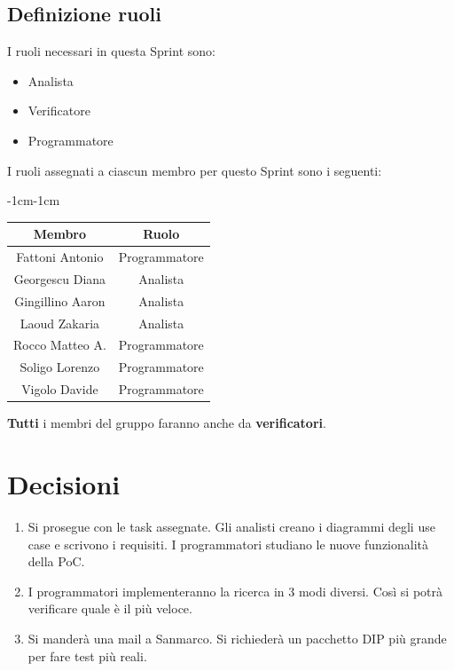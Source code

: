 \documentclass[a4paper,12pt]{article}
\begin{document}
\subsection{Definizione ruoli}
I ruoli necessari in questa Sprint sono:
\begin{itemize}[noitemsep]
    \item Analista
    \item Verificatore
    \item Programmatore
\end{itemize}

I ruoli assegnati a ciascun membro per questo Sprint sono i seguenti:
\begin{table}[H]
    \begin{adjustwidth}{-1cm}{-1cm}
    \centering
\begin{tabular}{|c|c|}
    \hline
    \textbf{Membro} & \textbf{Ruolo} \\
    \hline
    Fattoni Antonio & Programmatore \\
    \hline
    Georgescu Diana & Analista \\
    \hline
    Gingillino Aaron & Analista \\
    \hline
    Laoud Zakaria & Analista \\
    \hline
    Rocco Matteo A. & Programmatore \\
    \hline
    Soligo Lorenzo & Programmatore \\
    \hline
    Vigolo Davide & Programmatore \\
    \hline
\end{tabular}
    \end{adjustwidth}
\end{table}
\textbf{Tutti} i membri del gruppo faranno anche da \textbf{verificatori}.

\section{Decisioni}
\begin{enumerate}[noitemsep]
    \item Si prosegue con le task assegnate. Gli analisti creano i diagrammi degli use case e scrivono i requisiti. I programmatori studiano le nuove funzionalità della PoC.
    \item I programmatori implementeranno la ricerca in 3 modi diversi. Così si potrà verificare quale è il più veloce.
    \item Si manderà una mail a Sanmarco. Si richiederà un pacchetto DIP più grande per fare test più reali.
\end{enumerate}
\end{document}
